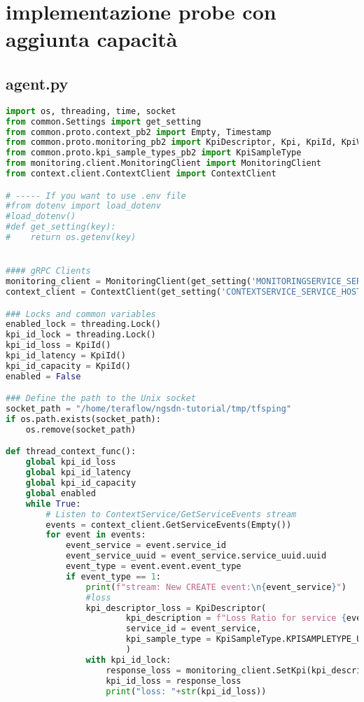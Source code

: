 \section{implementazione probe con aggiunta capacità}
\subsection{agent.py}
\begin{lstlisting}[language=Python]
import os, threading, time, socket
from common.Settings import get_setting
from common.proto.context_pb2 import Empty, Timestamp
from common.proto.monitoring_pb2 import KpiDescriptor, Kpi, KpiId, KpiValue
from common.proto.kpi_sample_types_pb2 import KpiSampleType
from monitoring.client.MonitoringClient import MonitoringClient
from context.client.ContextClient import ContextClient

# ----- If you want to use .env file
#from dotenv import load_dotenv
#load_dotenv()
#def get_setting(key):
#    return os.getenv(key)


#### gRPC Clients
monitoring_client = MonitoringClient(get_setting('MONITORINGSERVICE_SERVICE_HOST'), get_setting('MONITORINGSERVICE_SERVICE_PORT_GRPC'))
context_client = ContextClient(get_setting('CONTEXTSERVICE_SERVICE_HOST'), get_setting('CONTEXTSERVICE_SERVICE_PORT_GRPC'))

### Locks and common variables
enabled_lock = threading.Lock()
kpi_id_lock = threading.Lock()
kpi_id_loss = KpiId()
kpi_id_latency = KpiId()
kpi_id_capacity = KpiId()
enabled = False

### Define the path to the Unix socket
socket_path = "/home/teraflow/ngsdn-tutorial/tmp/tfsping"
if os.path.exists(socket_path):
    os.remove(socket_path)

def thread_context_func():
    global kpi_id_loss
    global kpi_id_latency
    global kpi_id_capacity
    global enabled
    while True:
        # Listen to ContextService/GetServiceEvents stream 
        events = context_client.GetServiceEvents(Empty())
        for event in events:
            event_service = event.service_id
            event_service_uuid = event_service.service_uuid.uuid
            event_type = event.event.event_type
            if event_type == 1:
                print(f"stream: New CREATE event:\n{event_service}")
                #loss
                kpi_descriptor_loss = KpiDescriptor(
                        kpi_description = f"Loss Ratio for service {event_service_uuid}",
                        service_id = event_service,
                        kpi_sample_type = KpiSampleType.KPISAMPLETYPE_UNKNOWN
                        )
                with kpi_id_lock:
                    response_loss = monitoring_client.SetKpi(kpi_descriptor_loss)
                    kpi_id_loss = response_loss
                    print("loss: "+str(kpi_id_loss))
                    

\end{lstlisting}
